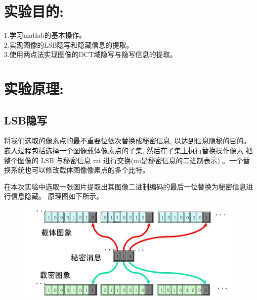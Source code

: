 \documentclass[a4paper,11pt,UTF8]{ctexart}
\newcommand{\bottomcaption}{%
\setlength{\abovecaptionskip}{6pt}%
\setlength{\belowcaptionskip}{6pt}%
\caption}
\newcommand{\xiaowuhao}{\fontsize{9pt}{\baselineskip}\selectfont}   %
\begin{document}
\section{实验目的:}
  {
    1.学习matlab的基本操作。\\
    \hspace*{22pt}2.实现图像的LSB隐写和隐藏信息的提取。\\
    \hspace*{22pt}3.使用两点法实现图像的DCT域隐写与隐写信息的提取。
  }

\section{实验原理:}

  \subsection{LSB隐写}
  将我们选取的像素点的最不重要位依次替换成秘密信息, 以达到信息隐秘的目的。
  嵌入过程包括选择一个图像载体像素点的子集, 然后在子集上执行替换操作像素 
  把整个图像的 LSB 与秘密信息 mi 进行交换(mi是秘密信息的二进制表示) 。一个替
  换系统也可以修改载体图像像素点的多个比特。\par
  在本次实验中选取一张图片提取出其图像二进制编码的最后一位替换为秘密信息进行信息隐藏。
  原理图如下所示。

  \begin{figure}[!htbp]
  \centering
  \includegraphics[width=\textwidth]{LSB.png}
  \bottomcaption{\xiaowuhao{LSB隐写原理}}
  \end{figure}
\end{document}

